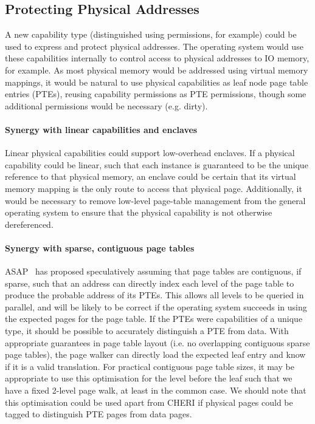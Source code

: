 \subsection{Protecting Physical Addresses}

A new capability type (distinguished using permissions, for example) could be
used to express and protect physical addresses.
The operating system would use these capabilities internally to control access
to physical addresses to IO memory, for example.
As most physical memory would be addressed using virtual memory mappings,
it would be natural to use physical capabilities as leaf node page table
entries (PTEs), reusing capability permissions as PTE permissions, though some
additional permissions would be necessary (e.g. dirty).

\paragraph{Synergy with linear capabilities and enclaves}
Linear physical capabilities could support low-overhead enclaves.
If a physical capability could be linear, such that each instance is guaranteed
to be the unique reference to that physical memory, an enclave could be certain
that its virtual memory mapping is the only route to access that
physical page.
Additionally, it would be necessary to remove low-level page-table management
from the general operating system to ensure that the physical capability is not otherwise
dereferenced.

\paragraph{Synergy with sparse, contiguous page tables}
ASAP~\cite{margaritov2019prefetched} has proposed speculatively assuming that page
tables are contiguous, if sparse,
such that an address can directly index each level of
the page table to produce the probable address of its PTEs.  This allows all levels
to be queried in parallel, and will be likely to be correct if the operating system
succeeds in using the expected pages for the page table.
If the PTEs were capabilities of a unique type, it should be possible to
accurately distinguish a PTE from data.
With appropriate guarantees in page table layout (i.e. no overlapping contiguous
sparse page tables), the page walker can directly load the expected leaf entry
and know if it is a valid translation.
For practical contiguous page table sizes, it may be appropriate to use this
optimisation for the level before the leaf such that we have a fixed 2-level
page walk, at least in the common case.
We should note that this optimisation could be used apart from CHERI if physical
pages could be tagged to distinguish PTE pages from data pages.


